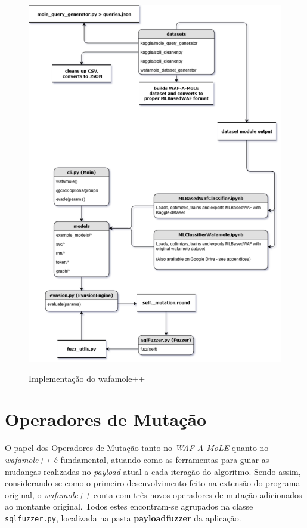 \begin{figure}[H]
    \centering
    \caption{Implementação do wafamole++}
    \includegraphics[width=16cm]{figuras/wafamole++_architecture.png} 
    \label{fig:internet} 
\end{figure}

\section{Operadores de Mutação}

O papel dos Operadores de Mutação tanto no \textit{WAF-A-MoLE} quanto no \textit{wafamole++} é fundamental, atuando como as ferramentas para guiar as mudanças realizadas no \textit{payload} atual a cada iteração do algoritmo. Sendo assim, considerando-se como o primeiro desenvolvimento feito na extensão do programa original, o \textit{wafamole++} conta com três novos operadores de mutação adicionados ao montante original. Todos estes encontram-se agrupados na classe \verb+sqlfuzzer.py+, localizada na pasta \textbf{payloadfuzzer} da aplicação.

